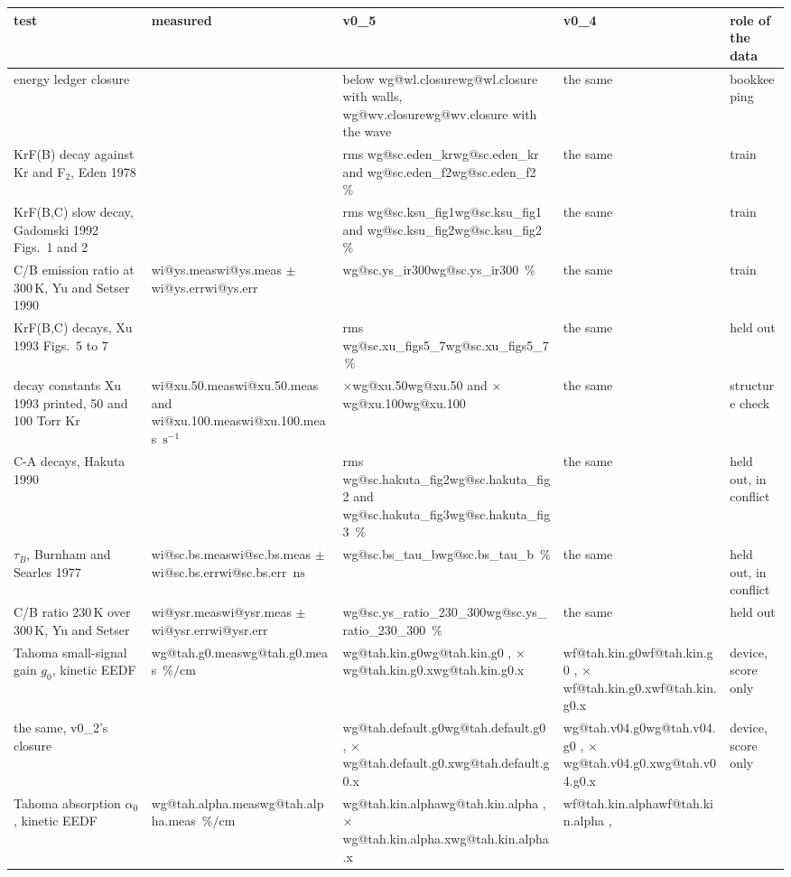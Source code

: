 \documentclass[11pt]{article}
\makeatletter
\newcommand\wi[1]{\ifcsname wi@#1\endcsname\csname wi@#1\endcsname
  \else\errmessage{no v0_2 number '#1'. Rerun make_overview_v0_2.py}\fi}
\newcommand\wf[1]{\ifcsname wf@#1\endcsname\csname wf@#1\endcsname
  \else\errmessage{no v0_4 number '#1'. Rerun make_overview_v0_4.py}\fi}
\newcommand\wg[1]{\ifcsname wg@#1\endcsname\csname wg@#1\endcsname
  \else\errmessage{no v0_5 number '#1'. Rerun make_overview_v0_5.py}\fi}
\newcommand{\unit}[1]{\ensuremath{\,\mathrm{#1}}}
\newcommand{\x}[1]{\ensuremath{\times}#1}
\makeatother
\begin{document}
\begin{table}[!tbp]
\centering\footnotesize
\renewcommand{\arraystretch}{1.12}
\begin{tabularx}{\linewidth}{@{}>{\raggedright\arraybackslash}X
  >{\raggedright\arraybackslash}p{2.3cm}>{\raggedright\arraybackslash}p{2.4cm}
  >{\raggedright\arraybackslash}p{2.3cm}>{\raggedright\arraybackslash}p{1.9cm}@{}}
\toprule
test & measured & v0\_5 & v0\_4 & role of the data\\
\midrule
energy ledger closure & & below \wg{wl.closure} with walls,
  \wg{wv.closure} with the wave & the same & bookkeeping\\
KrF(B) decay against Kr and F$_2$, Eden 1978 & & rms \wg{sc.eden_kr} and
  \wg{sc.eden_f2}\,\% & the same & train\\
KrF(B,C) slow decay, Gadomski 1992 Figs.\ 1 and 2 & & rms
  \wg{sc.ksu_fig1} and \wg{sc.ksu_fig2}\,\% & the same & train\\
C/B emission ratio at 300\unit{K}, Yu and Setser 1990 & \wi{ys.meas}
  $\pm$ \wi{ys.err} & \wg{sc.ys_ir300}\,\% & the same & train\\
KrF(B,C) decays, Xu 1993 Figs.\ 5 to 7 & & rms \wg{sc.xu_figs5_7}\,\% &
  the same & held out\\
decay constants Xu 1993 printed, 50 and 100 Torr Kr & \wi{xu.50.meas}
  and \wi{xu.100.meas}\unit{s^{-1}} & \x{\wg{xu.50}} and \x{\wg{xu.100}} &
  the same & structure check\\
C-A decays, Hakuta 1990 & & rms \wg{sc.hakuta_fig2} and
  \wg{sc.hakuta_fig3}\,\% & the same & held out, in conflict\\
$\tau_B$, Burnham and Searles 1977 & \wi{sc.bs.meas} $\pm$
  \wi{sc.bs.err}\unit{ns} & \wg{sc.bs_tau_b}\,\% & the same & held out, in
  conflict\\
C/B ratio 230\unit{K} over 300\unit{K}, Yu and Setser & \wi{ysr.meas}
  $\pm$ \wi{ysr.err} & \wg{sc.ys_ratio_230_300}\,\% & the same & held out\\
\midrule
Tahoma small-signal gain $g_0$, kinetic EEDF & \wg{tah.g0.meas}\unit{\%/cm} &
  \wg{tah.kin.g0}, \x{\wg{tah.kin.g0.x}} & \wf{tah.kin.g0}, \x{\wf{tah.kin.g0.x}} &
  device, score only\\
\quad the same, v0\_2's closure & & \wg{tah.default.g0},
  \x{\wg{tah.default.g0.x}} & \wg{tah.v04.g0}, \x{\wg{tah.v04.g0.x}} &
  device, score only\\
Tahoma absorption $\alpha_0$, kinetic EEDF & \wg{tah.alpha.meas}\unit{\%/cm}
  & \wg{tah.kin.alpha}, \x{\wg{tah.kin.alpha.x}} & \wf{tah.kin.alpha},

\end{tabularx}
\end{table}
\end{document}

